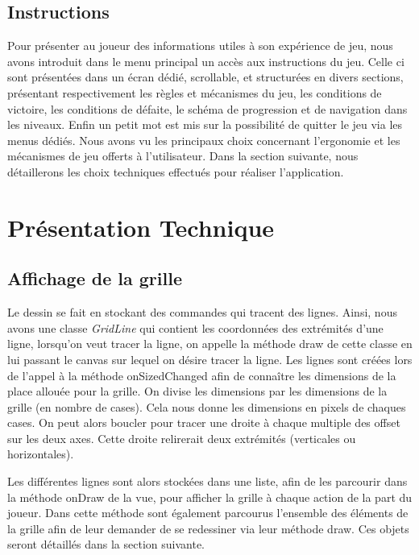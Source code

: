 \documentclass[12pt, a4paper]{article}%
\begin{document}
	\subsection{Instructions}
	Pour présenter au joueur des informations utiles à son expérience de jeu, nous avons introduit dans le menu principal un accès aux instructions du jeu. Celle ci sont présentées dans un écran dédié, scrollable, et structurées en divers sections, présentant respectivement les règles et mécanismes du jeu, les conditions de victoire, les conditions de défaite, le schéma de progression et de navigation dans les niveaux. Enfin un petit mot est mis sur la possibilité de quitter le jeu via les menus dédiés.
	\newline
	Nous avons vu les principaux choix concernant l'ergonomie et les mécanismes de jeu offerts à l'utilisateur. Dans la section suivante, nous détaillerons les choix techniques effectués pour réaliser l'application.
		 
\section{Présentation Technique}
    \subsection{Affichage de la grille}
    Le dessin se fait en stockant des commandes qui tracent des lignes. Ainsi, nous avons une classe \textit{GridLine} qui
    contient les coordonnées des extrémités d'une ligne, lorsqu'on veut tracer la ligne, on appelle la méthode draw de cette
    classe en lui passant le canvas sur lequel on désire tracer la ligne. Les lignes sont créées lors de l'appel à la méthode
    onSizedChanged afin de connaître les dimensions de la place allouée pour la grille. On divise les dimensions par les
    dimensions de la grille (en nombre de cases). Cela nous donne les dimensions en pixels de chaques cases. On peut alors boucler
    pour tracer une droite à chaque multiple des offset sur les deux axes. Cette droite relirerait deux extrémités (verticales ou
    horizontales).
    \newline

    Les différentes lignes sont alors stockées dans une liste, afin de les parcourir dans la méthode onDraw de la vue, pour
    afficher la grille à chaque action de la part du joueur. Dans cette méthode sont également parcourus l'ensemble des éléments
    de la grille afin de leur demander de se redessiner via leur méthode draw. Ces objets seront détaillés dans la section
    suivante.
    \newline
\end{document}
